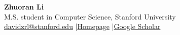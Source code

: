 \documentclass[a4paper,11pt]{article}
\begin{document}
\selectfont
\begin{center}
  {\LARGE\textbf{Zhuoran Li}}\\[4pt]
  M.S. student in Computer Science, Stanford University\\[3pt]
  {\small
    \href{mailto:davidzrl@stanford.edu}{davidzrl@stanford.edu}
    \enspace|\enspace \href{https://zhuoranli23.github.io/}{Homepage}
    \enspace|\enspace \href{https://scholar.google.com/citations?user=NcQERBIAAAAJ}{Google Scholar}}
\end{center}






\end{document}
